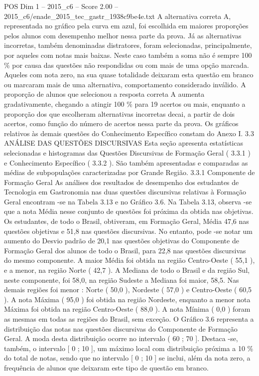\begin{textsample}{POS Dim 1 – 2015\_c6 – Score 2.00 – 2015\_c6/enade\_2015\_tec\_gastr\_1938c9be4e.txt}
A alternativa correta A, representada no gráfico pela curva em azul, foi escolhida em maiores proporções pelos alunos com desempenho melhor nessa parte da prova.
Já as alternativas incorretas, também denominadas distratores, foram selecionadas, principalmente, por aqueles com notas mais baixas.
Neste caso também a soma não é sempre 100 \% por causa das questões não respondidas ou com mais de uma opção marcada.
Aqueles com nota zero, na sua quase totalidade deixaram esta questão em branco ou marcaram mais de uma alternativa, comportamento considerado inválido.
A proporção de alunos que selecionou a resposta correta A aumenta gradativamente, chegando a atingir 100 \% para 19 acertos ou mais, enquanto a proporção dos que escolheram alternativas incorretas decai, a partir de dois acertos, como função do número de acertos nessa parte da prova.
Os gráficos relativos às demais questões do Conhecimento Específico constam do Anexo I. 3.3 ANÁLISE DAS QUESTÕES DISCURSIVAS Esta seção apresenta estatísticas selecionadas e histogramas das Questões Discursivas de Formação Geral ( 3.3.1 ) e Conhecimento Específico ( 3.3.2 ).
São também apresentadas e comparadas as médias de subpopulações caracterizadas por Grande Região. 3.3.1 Componente de Formação Geral As análises dos resultados de desempenho dos estudantes de Tecnologia em Gastronomia nas duas questões discursivas relativas à Formação Geral encontram -se na Tabela 3.13 e no Gráfico 3.6.
Na Tabela 3.13, observa -se que a nota Média nesse conjunto de questões foi próxima da obtida nas objetivas.
Os estudantes, de todo o Brasil, obtiveram, em Formação Geral, Média 47,6 nas questões objetivas e 51,8 nas questões discursivas.
No entanto, pode -se notar um aumento do Desvio padrão de 20,1 nas questões objetivas do Componente de Formação Geral dos alunos de todo o Brasil, para 22,8 nas questões discursivas do mesmo componente.
A maior Média foi obtida na região Centro-Oeste ( 55,1 ), e a menor, na região Norte ( 42,7 ).
A Mediana de todo o Brasil e da região Sul, neste componente, foi 58,0, na região Sudeste a Mediana foi maior, 58,5.
Nas demais regiões foi menor : Norte ( 50,0 ), Nordeste ( 57,0 ) e Centro-Oeste ( 60,5 ).
A nota Máxima ( 95,0 ) foi obtida na região Nordeste, enquanto a menor nota Máxima foi obtida na região Centro-Oeste ( 88,0 ).
A nota Mínima ( 0,0 ) foram as mesmas em todas as regiões do Brasil, sem exceção.
O Gráfico 3.6 representa a distribuição das notas nas questões discursivas do Componente de Formação Geral.
A moda desta distribuição ocorre no intervalo ( 60 ; 70 ].
Destaca -se, também, o intervalo [ 0 ; 10 ], um máximo local com distribuição próxima a 10 \% do total de notas, sendo que no intervalo [ 0 ; 10 ] se inclui, além da nota zero, a frequência de alunos que deixaram este tipo de questão em branco.

\end{textsample}
